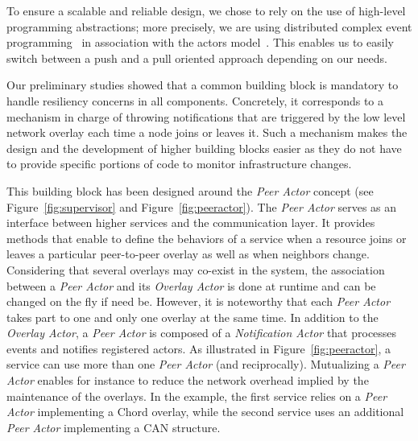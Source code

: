 To ensure a scalable and reliable design, we  chose to rely on the use
of high-level programming abstractions; more precisely, we are using distributed
complex event programming~\cite{janiesch:2011} in association with the actors
model~\cite{agha:1986}. This enables us to easily switch between a push and a pull
oriented approach depending on our needs. 

Our preliminary studies showed that a common building block is mandatory to
handle resiliency concerns in all components. Concretely, it corresponds to a
mechanism in charge of throwing notifications that are triggered by the low
level network overlay each time a node joins or leaves it.  Such a mechanism
makes the design and the development of higher building blocks easier as they do
not have to provide specific portions of code to monitor infrastructure
changes. 

This building block has been designed around the \emph{Peer Actor} concept (see Figure~\ref{fig:supervisor} and
Figure~\ref{fig:peeractor}).
 The \emph{Peer Actor} serves as an interface between higher services
and the communication layer. It provides methods that enable to define the behaviors of a
service when a resource joins or leaves a particular peer-to-peer overlay as well as
when neighbors change.
Considering that several overlays may co-exist in the \discovery system, 
the association between a \emph{Peer Actor} and its \emph{Overlay Actor} is
done at runtime and can be changed on the fly if need be. However, it is noteworthy that 
each \emph{Peer Actor} takes part to one and only one overlay at the same time.  
%
In addition to the \emph{Overlay Actor}, a \emph{Peer Actor}  is composed of a
\emph{Notification Actor}  that processes events and notifies registered actors.
%
As illustrated in Figure~\ref{fig:peeractor}, a service can use more than one \emph{Peer Actor} (and reciprocally). 
Mutualizing a \emph{Peer Actor} enables for instance to reduce the network overhead implied by the maintenance of the overlays. 
In the example, the first service relies on a \emph{Peer Actor} implementing a Chord
overlay, while the second service uses an additional \emph{Peer Actor} implementing a CAN structure.
 
